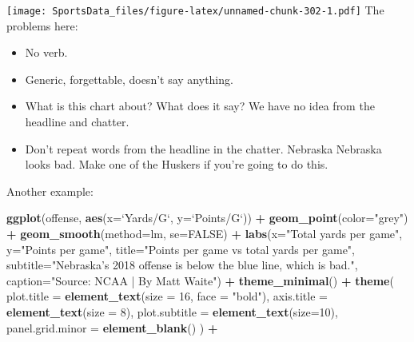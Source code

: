 \documentclass[
]{book}
\newenvironment{Shaded}{\begin{snugshade}}{\end{snugshade}}
\newcommand{\DataTypeTok}[1]{\textcolor[rgb]{0.13,0.29,0.53}{#1}}
\newcommand{\DecValTok}[1]{\textcolor[rgb]{0.00,0.00,0.81}{#1}}
\newcommand{\KeywordTok}[1]{\textcolor[rgb]{0.13,0.29,0.53}{\textbf{#1}}}
\newcommand{\NormalTok}[1]{#1}
\newcommand{\OperatorTok}[1]{\textcolor[rgb]{0.81,0.36,0.00}{\textbf{#1}}}
\newcommand{\OtherTok}[1]{\textcolor[rgb]{0.56,0.35,0.01}{#1}}
\newcommand{\StringTok}[1]{\textcolor[rgb]{0.31,0.60,0.02}{#1}}
\providecommand{\tightlist}{%
  \setlength{\itemsep}{0pt}\setlength{\parskip}{0pt}}
\begin{document}
\texttt{[image: SportsData\_files/figure-latex/unnamed-chunk-302-1.pdf]}
The problems here:

\begin{itemize}
\tightlist
\item
  No verb.
\item
  Generic, forgettable, doesn't say anything.
\item
  What is this chart about? What does it say? We have no idea from the headline and chatter.
\item
  Don't repeat words from the headline in the chatter. Nebraska Nebraska looks bad. Make one of the Huskers if you're going to do this.
\end{itemize}

Another example:

\begin{Shaded}
\begin{Highlighting}[]
\KeywordTok{ggplot}\NormalTok{(offense, }\KeywordTok{aes}\NormalTok{(}\DataTypeTok{x=}\StringTok{`}\DataTypeTok{Yards/G}\StringTok{`}\NormalTok{, }\DataTypeTok{y=}\StringTok{`}\DataTypeTok{Points/G}\StringTok{`}\NormalTok{)) }\OperatorTok{+}\StringTok{ }
\StringTok{  }\KeywordTok{geom_point}\NormalTok{(}\DataTypeTok{color=}\StringTok{"grey"}\NormalTok{) }\OperatorTok{+}\StringTok{ }\KeywordTok{geom_smooth}\NormalTok{(}\DataTypeTok{method=}\NormalTok{lm, }\DataTypeTok{se=}\OtherTok{FALSE}\NormalTok{) }\OperatorTok{+}\StringTok{ }
\StringTok{  }\KeywordTok{labs}\NormalTok{(}\DataTypeTok{x=}\StringTok{"Total yards per game"}\NormalTok{, }\DataTypeTok{y=}\StringTok{"Points per game"}\NormalTok{, }\DataTypeTok{title=}\StringTok{"Points per game vs total yards per game"}\NormalTok{, }\DataTypeTok{subtitle=}\StringTok{"Nebraska's 2018 offense is below the blue line, which is bad."}\NormalTok{, }\DataTypeTok{caption=}\StringTok{"Source: NCAA | By Matt Waite"}\NormalTok{) }\OperatorTok{+}\StringTok{ }
\StringTok{  }\KeywordTok{theme_minimal}\NormalTok{() }\OperatorTok{+}\StringTok{ }
\StringTok{  }\KeywordTok{theme}\NormalTok{(}
    \DataTypeTok{plot.title =} \KeywordTok{element_text}\NormalTok{(}\DataTypeTok{size =} \DecValTok{16}\NormalTok{, }\DataTypeTok{face =} \StringTok{"bold"}\NormalTok{),}
    \DataTypeTok{axis.title =} \KeywordTok{element_text}\NormalTok{(}\DataTypeTok{size =} \DecValTok{8}\NormalTok{), }
    \DataTypeTok{plot.subtitle =} \KeywordTok{element_text}\NormalTok{(}\DataTypeTok{size=}\DecValTok{10}\NormalTok{), }
    \DataTypeTok{panel.grid.minor =} \KeywordTok{element_blank}\NormalTok{()}
\NormalTok{    ) }\OperatorTok{+}

\end{Highlighting}
\end{Shaded}
\end{document}
